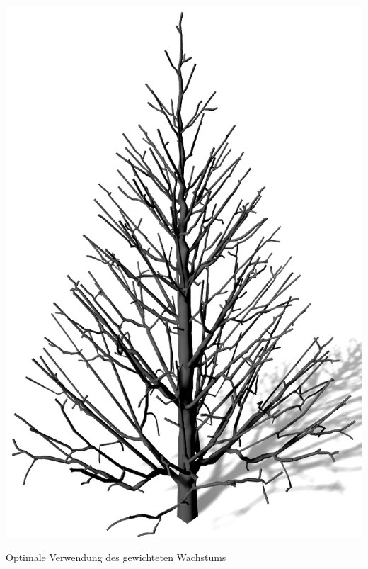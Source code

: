 \begin{center}
\begin{minipage}[c]{0.45\textwidth}
		\includegraphics[height=.9\textheight]{images/SCA_GewWachstum_On}
	\end{minipage}
	\vspace{0.05\textheight}
	
	Optimale Verwendung des gewichteten Wachstums
\end{center}
